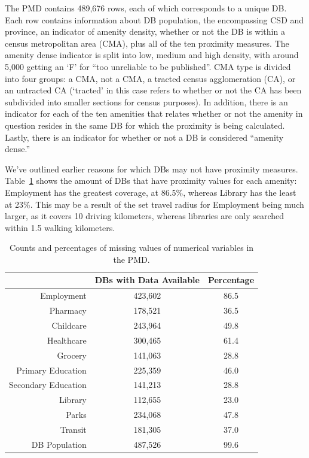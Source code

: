 \documentclass[11pt, a4paper]{article}
\begin{document}
The PMD contains 489,676 rows, each of which corresponds to a unique DB. Each row contains information about DB population, the encompassing CSD and province, an indicator of amenity density, whether or not the DB is within a census metropolitan area (CMA), plus all of the ten proximity measures. The amenity dense indicator is split into low, medium and high density, with around 5,000 getting an `F' for ``too unreliable to be published''. CMA type is divided into four groups: a CMA, not a CMA, a tracted census agglomeration (CA), or an untracted CA (`tracted' in this case refers to whether or not the CA has been subdivided into smaller sections for census purposes). In addition, there is an indicator for each of the ten amenities that relates whether or not the amenity in question resides in the same DB for which the proximity is being calculated. Lastly, there is an indicator for whether or not a DB is considered ``amenity dense.''
\par
We've outlined earlier reasons for which DBs may not have proximity measures. Table~\ref{missingdata} shows the amount of DBs that have proximity values for each amenity: Employment has the greatest coverage, at 86.5\%, whereas Library has the least at 23\%. This may be a result of the set travel radius for Employment being much larger, as it covers 10 driving kilometers, whereas libraries are only searched within 1.5 walking kilometers.




\begin{table}[H]
\centering
\caption[Missing data]{Counts and percentages of missing values of numerical variables in the PMD.}\label{missingdata}
\begin{tabular}{|r|cc|}
  \hline
 & DBs with Data Available & Percentage \\
  \hline
Employment & 423,602 & 86.5 \\
  Pharmacy & 178,521 & 36.5 \\
  Childcare & 243,964 & 49.8 \\
  Healthcare & 300,465 & 61.4 \\
  Grocery & 141,063 & 28.8 \\
  Primary Education & 225,359 & 46.0 \\
  Secondary Education & 141,213 & 28.8 \\
  Library & 112,655 & 23.0 \\
  Parks & 234,068 & 47.8 \\
  Transit & 181,305 & 37.0 \\
  DB Population & 487,526 & 99.6 \\
   \hline
\end{tabular}
\end{table}
\end{document}
